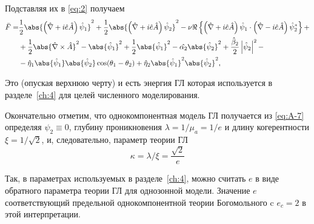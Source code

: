 Подставляя их в \eqref{eq:2} получаем
\begin{align}
  \bar{F} = & \frac{1}{2}\abs{\left( \hat{\nabla} + i\hat{e}\hat{A} \right)
    \hat{\psi}_1}^2 + \frac{1}{2}\abs{\left( \hat{\nabla} + i\hat{e}\hat{A}
    \right)\hat{\psi}_2}^2 - \nu\Re\left\{ \left( \hat{\nabla} + i\hat{e}\hat{A}
    \right) \hat{\psi}_1 \cdot \left( \hat{\nabla} - i\hat{e}\hat{A} \right)
    \hat{\psi}^*_2 \right\} + \nonumber \\
  & + \frac{1}{2}\abs{\hat{\nabla}\times\hat{A}}^2 - \abs{\hat{\psi}_1}^2 +
    \frac{1}{2}\abs{\hat{\psi}_1}^2 - \hat{\alpha_2}\abs{\hat{\psi}_2}^2 +
    \frac{\hat{\beta}_2}{2}\left| \hat{\psi}_2 \right|^2 - \nonumber \\
  & - \hat{\eta}_1\abs{\hat{\psi}_1}\abs{\hat{\psi}_2} \cos(\theta_1 - \theta_2)
    + \hat{\eta}_2\abs{\hat{\psi}_1}^2 \abs{\hat{\psi}_2}^2, \label{eq:A-7}
\end{align}

Это (опуская верхнюю черту) и есть энергия ГЛ которая
используется в разделе~\ref{ch:4} для целей численного моделирования.

Окончательно отметим, что однокомпонентная модель ГЛ получается
из \eqref{eq:A-7} определяя \( \psi_2 \equiv 0 \), глубину проникновения
\( \lambda = 1/\mu_a = 1/e \) и длину когерентности
\( \xi = 1/\sqrt{2} \), и, следовательно, параметр теории ГЛ
\begin{equation}
  \kappa = \lambda/\xi = \frac{\sqrt{2}}{e}
  \label{eq:A-8}
\end{equation}

Так, в параметрах используемых в разделе~\ref{ch:4}, можно считать \( e \) в виде
обратного параметра теории ГЛ для однозонной модели. Значение \( e \)
соответствующий предельной однокомпонентной теории Богомольного c
\( e_c = 2 \) в этой интерпретации.
